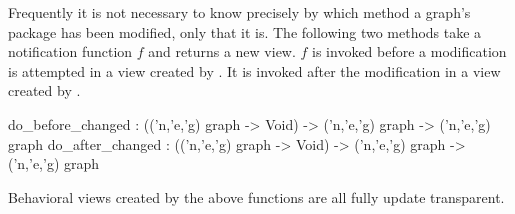 Frequently it is not necessary to know precisely by which method a graph's
package has been modified, only that it is.  The following two methods
take a notification function $f$ and returns a new view.  $f$ is
invoked before a modification is attempted in a view created
by .  It is invoked after the modification in
a view created by .
\begin{SML}
   do_before_changed : (('n,'e,'g) graph -> Void) -> ('n,'e,'g) graph -> ('n,'e,'g) graph
   do_after_changed : (('n,'e,'g) graph -> Void) -> ('n,'e,'g) graph -> ('n,'e,'g) graph
\end{SML}

Behavioral views created by the above functions are all fully update
transparent.
